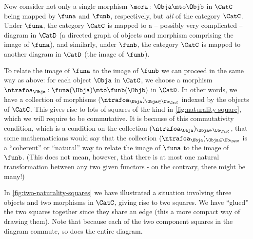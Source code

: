 %
\begin{marginfigure}
\centering
    \caption{}
    \label{fig:naturality-square}
\end{marginfigure}
%

Now consider not only a single morphism $\mora : \Obja \mto \Objb$ in $\CatC$ being mapped by $\funa$ and $\funb$, respectively, but \emph{all} of the category $\CatC$. Under $\funa$, the category $\CatC$ is mapped to a -- possibly very complicated --  diagram in $\CatD$ (a directed graph of objects and morphism comprising the image of $\funa$), and similarly, under $\funb$, the category $\CatC$ is mapped to another diagram in $\CatD$ (the image of $\funb$). 

To relate the image of $\funa$ to the image of $\funb$ we can proceed in the same way as above: for each object $\Obja$ in $\CatC$, we choose a morphism $\ntrafoa_\Obja : \funa(\Obja) \mto \funb(\Objb)$ in $\CatD$. In other words, we have a collection of morphisms $(\ntrafoa_\Obja)_{\Obja \in \Ob_\CatC}$ indexed by the objects of $\CatC$. 
This gives rise to lots of squares of the kind in \cref{fig:naturality-square}, which we will require to be commutative. It is because of this commutativity condition, which is a condition on the collection $(\ntrafoa_\Obja)_{\Obja \in \Ob_\CatC}$, that some mathematicians would say that the collection $(\ntrafoa_\Obja)_{\Obja \in \Ob_\CatC}$ is a ``coherent'' or ``natural'' way to relate the image of $\funa$ to the image of $\funb$. (This does not mean, however, that there is at most one natural transformation between any two given functors - on the contrary, there might be many!)


In \cref{fig:two-naturality-squares} we have illustrated a situation involving three objects and two morphisms in $\CatC$, giving rise to two squares. We have ``glued'' the two squares together since they share an edge (this a more compact way of drawing them). Note that because each of the two component squares in the diagram commute, so does the entire diagram. 

%
\begin{marginfigure}
\centering
    \caption{}
    \label{fig:two-naturality-squares}
\end{marginfigure}
%



\


